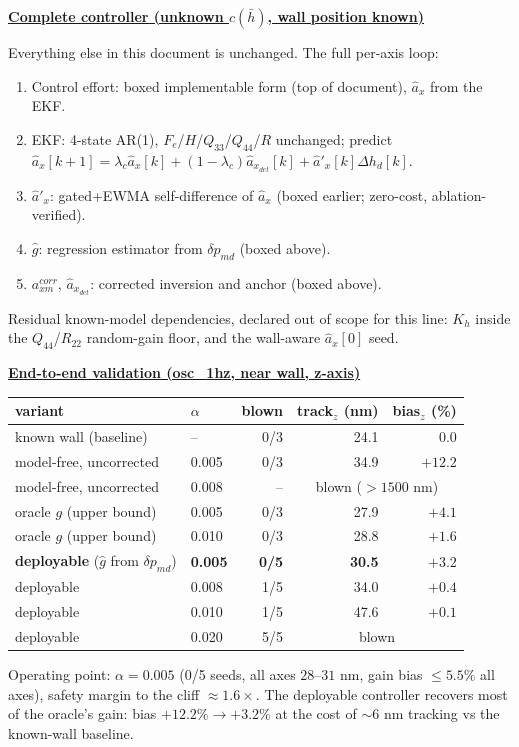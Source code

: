 \documentclass[11pt,a4paper,fontset=none]{ctexart}
\newcommand{\lc}{\lambda_c}
\newcommand{\hd}[1]{\par\medskip\noindent\underline{\textbf{#1}}\par\nobreak\vspace{0.2ex}}
\begin{document}
\hd{Complete controller (unknown $c(\bar h)$, wall position known)}
Everything else in this document is unchanged. The full per-axis loop:
\begin{enumerate}[leftmargin=*,topsep=0pt,itemsep=0pt]
\item Control effort: boxed implementable form (top of document), $\hat a_x$ from the EKF.
\item EKF: 4-state AR(1), $F_e$/$H$/$Q_{33}$/$Q_{44}$/$R$ unchanged; predict $\hat a_x[k+1] = \lc\hat a_x[k] + (1-\lc)\hat a_{x_{det}}[k] + \hat a'_x[k]\Delta h_d[k]$.
\item $\hat a'_x$: gated+EWMA self-difference of $\hat a_x$ (boxed earlier; zero-cost, ablation-verified).
\item $\hat g$: regression estimator from $\delta p_{md}$ (boxed above).
\item $a_{xm}^{corr}$, $\hat a_{x_{det}}$: corrected inversion and anchor (boxed above).
\end{enumerate}
Residual known-model dependencies, declared out of scope for this line: $K_h$ inside the $Q_{44}$/$R_{22}$ random-gain floor, and the wall-aware $\hat a_x[0]$ seed.

\hd{End-to-end validation (osc\_1hz, near wall, z-axis)}
\begin{center}
\begin{tabular}{llrrr}
\toprule
variant & $\alpha$ & blown & track$_z$ (nm) & bias$_z$ (\%) \\
\midrule
known wall (baseline)        & --    & 0/3 & 24.1 & 0.0 \\
model-free, uncorrected      & 0.005 & 0/3 & 34.9 & $+12.2$ \\
model-free, uncorrected      & 0.008 & --  & \multicolumn{2}{c}{blown ($>1500$ nm)} \\
oracle $g$ (upper bound)     & 0.005 & 0/3 & 27.9 & $+4.1$ \\
oracle $g$ (upper bound)     & 0.010 & 0/3 & 28.8 & $+1.6$ \\
\textbf{deployable} ($\hat g$ from $\delta p_{md}$) & \textbf{0.005} & \textbf{0/5} & \textbf{30.5} & $\bm{+3.2}$ \\
deployable                   & 0.008 & 1/5 & 34.0 & $+0.4$ \\
deployable                   & 0.010 & 1/5 & 47.6 & $+0.1$ \\
deployable                   & 0.020 & 5/5 & \multicolumn{2}{c}{blown} \\
\bottomrule
\end{tabular}
\end{center}
Operating point: $\alpha = 0.005$ (0/5 seeds, all axes $28$--$31$ nm, gain bias $\le 5.5\%$ all axes), safety margin to the cliff $\approx 1.6\times$. The deployable controller recovers most of the oracle's gain: bias $+12.2\%\to+3.2\%$ at the cost of $\sim6$ nm tracking vs the known-wall baseline.
\end{document}
